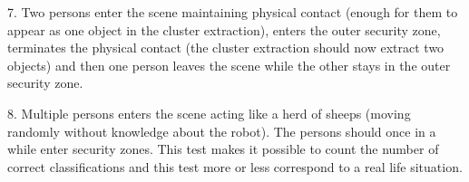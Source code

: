 7. Two persons enter the scene maintaining physical contact (enough for them to appear as one object in the cluster extraction), enters the outer security zone, terminates the physical contact (the cluster extraction should now extract two objects) and then one person leaves the scene while the other stays in the outer security zone.


8. Multiple persons enters the scene acting like a herd of sheeps (moving randomly without knowledge about the robot). The persons should once in a while enter security zones. This test makes it possible to count the number of correct classifications and this test more or less correspond to a real life situation. 
